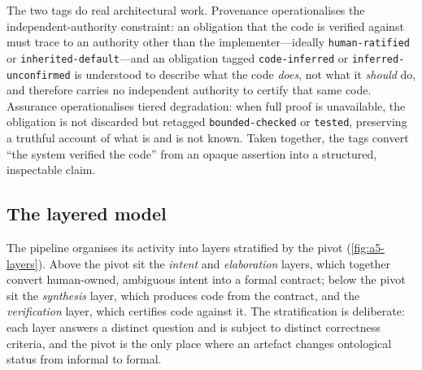 The two tags do real architectural work. Provenance operationalises the independent-authority constraint: an obligation that the code is verified against must trace to an authority other than the implementer---ideally \texttt{human-ratified} or \texttt{inherited-default}---and an obligation tagged \texttt{code-inferred} or \texttt{inferred-unconfirmed} is understood to describe what the code \emph{does}, not what it \emph{should} do, and therefore carries no independent authority to certify that same code. Assurance operationalises tiered degradation: when full proof is unavailable, the obligation is not discarded but retagged \texttt{bounded-checked} or \texttt{tested}, preserving a truthful account of what is and is not known. Taken together, the tags convert ``the system verified the code'' from an opaque assertion into a structured, inspectable claim.

\subsection{The layered model}\label{subsec:a5-layers}

The pipeline organises its activity into layers stratified by the pivot (\cref{fig:a5-layers}). Above the pivot sit the \emph{intent} and \emph{elaboration} layers, which together convert human-owned, ambiguous intent into a formal contract; below the pivot sit the \emph{synthesis} layer, which produces code from the contract, and the \emph{verification} layer, which certifies code against it. The stratification is deliberate: each layer answers a distinct question and is subject to distinct correctness criteria, and the pivot is the only place where an artefact changes ontological status from informal to formal.


